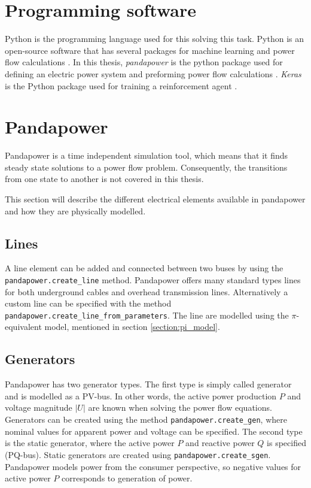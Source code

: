 \documentclass[class=book, crop=false]{standalone}
\begin{document}
\section{Programming software}
Python is the programming language used for this solving this task. Python is an open-source software that has several packages for machine learning and power flow calculations \cite{python_web}. In this thesis, \textit{pandapower} is the python package used for defining an electric power system and preforming power flow calculations \cite{pandapower}. \textit{Keras} is the Python package used for training a reinforcement agent \cite{keras_chollet2015}.

\section{Pandapower}
Pandapower is a time independent simulation tool, which means that it finds steady state solutions to a power flow problem. Consequently, the transitions from one state to another is not covered in this thesis.

This section will describe the different electrical elements available in pandapower and how they are physically modelled.
\subsection{Lines}
A line element can be added and connected between two buses by using the \texttt{pandapower.create\_line} method. Pandapower offers many standard types lines for both underground cables and overhead transmission lines. Alternatively a custom line can be specified with the method \texttt{pandapower.create\_line\_from\_parameters}. The line are modelled using the $\pi$-equivalent model, mentioned in section \ref{section:pi_model}.

\subsection{Generators}
Pandapower has two generator types. The first type is simply called generator and is modelled as a PV-bus. In other words, the active power production $P$ and voltage magnitude $|U|$ are known when solving the power flow equations. Generators can be created using the method \texttt{pandapower.create\_gen}, where nominal values for apparent power and voltage can be specified. The second type is the static generator, where the active power $P$ and reactive power $Q$ is specified (PQ-bus). Static generators are created using \texttt{pandapower.create\_sgen}. Pandapower models power from the consumer perspective, so negative values for active power $P$ corresponds to generation of power.
\end{document}
